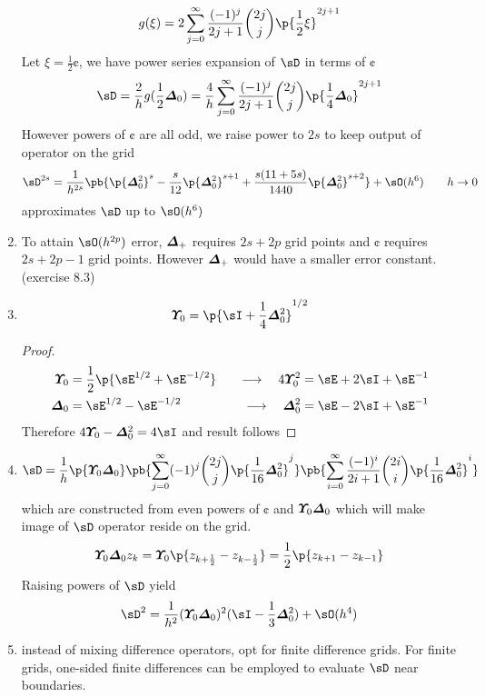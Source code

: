 \documentclass[11pt]{article}
\begin{document}
\begin{enumerate}
    \[
        g(\xi) = 2 \sum_{j=0}^{\infty} \frac{(-1)^j}{2j + 1} \binom{2j}{j} \p{\frac{1}{2} \xi}^{2j+1}    
    \]
    Let $\xi = \textstyle\frac{1}{2} \cent$, we have power series expansion of $\diff$ in terms of $\cent$
    \[
        \diff = \frac{2}{h} g(\frac{1}{2} \cent)
        = \frac{4}{h} \sum_{j=0}^{\infty} \frac{(-1)^j}{2j+1} \binom{2j}{j} \p{\frac{1}{4} \cent}^{2j+1}
    \]
    However powers of $\cent$ are all odd, we raise power to $2s$ to keep output of operator on the grid
    \[
        \diff^{2s} = \frac{1}{h^{2s}}     \pb{
            \p{\cent^2}^s - \frac{s}{12} \p{\cent^2}^{s+1} + \frac{s(11+5s)}{1440} \p{\cent^2}^{s+2}
        } + \sO(h^6)
        \quad \quad  h\to 0
    \]
    approximates $\diff$ up to $\sO(h^6)$
    \item {} To attain $\sO(h^{2p})$ error, $\boldsymbol{\varDelta}_+$ requires $2s+2p$ grid points and $\cent$ requires $2s+2p-1$ grid points. However $\boldsymbol{\varDelta}_+$ would have a smaller error constant. (exercise 8.3)
    \item {}
    \[
        \avg = \p{\id + \frac{1}{4}\cent^2}^{1/2}    
    \]
    \begin{proof}
    \begin{align*}
        \avg &= \frac{1}{2} \p{\shift^{1/2} + \shift^{-1/2}}
        \quad &\longrightarrow \quad
        4\avg^2 &= \shift + 2\id + \shift^{-1} \\
        \cent &= \shift^{1/2} - \shift^{-1/2}
        \quad &\longrightarrow \quad
        \cent^2 &= \shift - 2\id + \shift^{-1}
    \end{align*}
    Therefore $4\avg - \cent^2 = 4\id$ and result follows
    \end{proof}
    \item {} 
    \[
        \diff = \frac{1}{h} \p{\avg\cent} \pb{
            \sum_{j=0}^{\infty} (-1)^j \binom{2j}{j} \p{\frac{1}{16}\cent^2}^j
        }\pb{
            \sum_{i=0}^{\infty} \frac{(-1)^i}{2i + 1} \binom{2i}{i} \p{\frac{1}{16}\cent^2}^i
        }
    \]
    which are constructed from even powers of $\cent$ and $\boldsymbol{\varUpsilon}_0\boldsymbol{\varDelta}_0$ which will make image of $\diff$ operator reside on the grid.
    \[
        \avg\cent z_k = \avg \p{z_{k+\frac{1}{2}} - z_{k - \frac{1}{2}}} = \frac{1}{2}\p{z_{k+1} - z_{k-1}}
    \]
    Raising powers of $\diff$ yield
    \[
        \diff^{2} = \frac{1}{h^2} (\avg\cent)^2 (\id - \frac{1}{3}\cent^2) + \sO(h^4)
    \]
    \item {} instead of mixing difference operators, opt for finite difference grids. For finite grids, one-sided finite differences can be employed to evaluate $\diff$ near boundaries. 
\end{enumerate}
\end{document}
